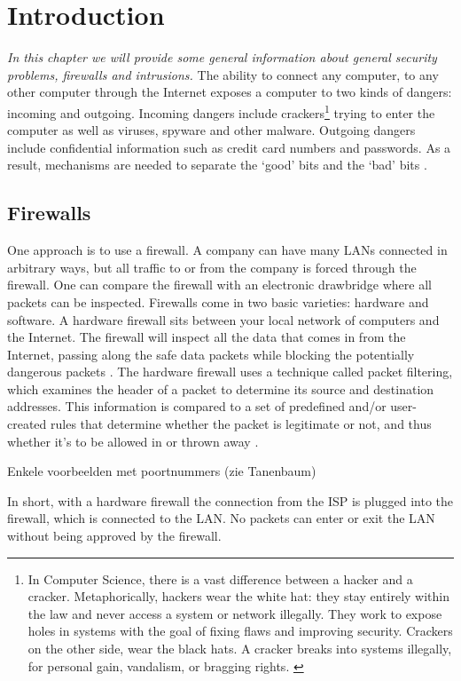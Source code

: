 \chapter{Introduction}
\emph{In this chapter we will provide some general information about general security problems, firewalls and intrusions.}
\minitoc
The ability to connect any computer, to any other computer through the Internet exposes a computer to two kinds of dangers:  incoming and outgoing. Incoming dangers include crackers\footnote{In Computer Science, there is a vast difference between a hacker and a cracker. Metaphorically, hackers wear the white hat: they stay entirely within the law and never access a system or network illegally. They work to expose holes in systems with the goal of fixing flaws and improving security. Crackers on the other side, wear the black hats. A cracker breaks into systems illegally, for personal gain, vandalism, or bragging rights. \citep{Cracker}} trying to enter the computer as well as viruses, spyware and other malware.  Outgoing dangers include confidential  information such as credit card numbers and passwords. As a result, mechanisms are needed to separate the `good' bits and the `bad' bits \citep{Tanenbaum}.

\section{Firewalls} 

One \label{sec:Firewalls}  approach is to use a firewall. A company can have many LANs connected in arbitrary ways, but all traffic to or from the company is forced  through the firewall. One can compare the firewall with an electronic drawbridge where all packets can be inspected.
Firewalls  come  in two basic varieties: hardware and software. A hardware firewall sits between your local network of computers and the Internet. The firewall will inspect all the data that comes in from the Internet, passing along the safe data packets while blocking the potentially dangerous packets \citep{Firewall}. The hardware firewall uses a technique called packet filtering, which examines the header of a packet to determine its source and destination addresses. This information is compared to a set of predefined and/or user-created rules that determine whether the packet is legitimate or not, and thus whether it’s to be allowed in or thrown away \citep{Firewall2}.

Enkele voorbeelden met poortnummers (zie Tanenbaum)

In short, with a hardware firewall the connection from the ISP is plugged into the firewall,  which is connected to the LAN.  No packets can enter or exit the LAN without being approved by  the  firewall.


